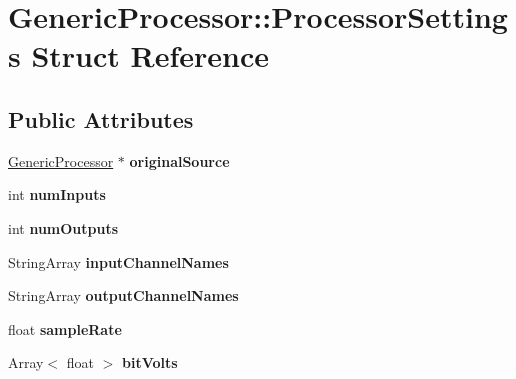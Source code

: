 \hypertarget{structGenericProcessor_1_1ProcessorSettings}{\section{Generic\-Processor\-:\-:Processor\-Settings Struct Reference}
\label{structGenericProcessor_1_1ProcessorSettings}
}
\subsection*{Public Attributes}
\begin{DoxyCompactItemize}
\item 
\hypertarget{structGenericProcessor_1_1ProcessorSettings_ab0ba3880def3c20e2ab2560ec7c6e5cb}{\hyperlink{classGenericProcessor}{Generic\-Processor} $\ast$ {\bfseries original\-Source}}\label{structGenericProcessor_1_1ProcessorSettings_ab0ba3880def3c20e2ab2560ec7c6e5cb}

\item 
\hypertarget{structGenericProcessor_1_1ProcessorSettings_a76691b54183d1d91d63ebe0e6e24db18}{int {\bfseries num\-Inputs}}\label{structGenericProcessor_1_1ProcessorSettings_a76691b54183d1d91d63ebe0e6e24db18}

\item 
\hypertarget{structGenericProcessor_1_1ProcessorSettings_a5024da44b1a3390b6d35e1c1a0676103}{int {\bfseries num\-Outputs}}\label{structGenericProcessor_1_1ProcessorSettings_a5024da44b1a3390b6d35e1c1a0676103}

\item 
\hypertarget{structGenericProcessor_1_1ProcessorSettings_aae6022216dd984111385087145c82b1f}{String\-Array {\bfseries input\-Channel\-Names}}\label{structGenericProcessor_1_1ProcessorSettings_aae6022216dd984111385087145c82b1f}

\item 
\hypertarget{structGenericProcessor_1_1ProcessorSettings_a280cd570b263d71dd222b9615a87a90a}{String\-Array {\bfseries output\-Channel\-Names}}\label{structGenericProcessor_1_1ProcessorSettings_a280cd570b263d71dd222b9615a87a90a}

\item 
\hypertarget{structGenericProcessor_1_1ProcessorSettings_aa843e36bf3dd136bc5685d327fd13452}{float {\bfseries sample\-Rate}}\label{structGenericProcessor_1_1ProcessorSettings_aa843e36bf3dd136bc5685d327fd13452}

\item 
\hypertarget{structGenericProcessor_1_1ProcessorSettings_aee620ffae429abba415bd912cad2c57d}{Array$<$ float $>$ {\bfseries bit\-Volts}}\label{structGenericProcessor_1_1ProcessorSettings_aee620ffae429abba415bd912cad2c57d}


\end{DoxyCompactItemize}

